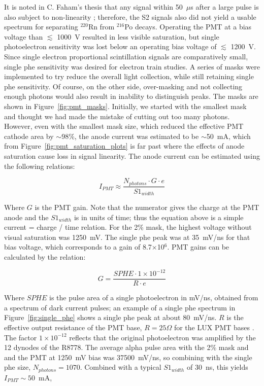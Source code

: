It is noted in C. Faham's thesis that any signal within 50~$\mu$s after a large pulse is also subject to non-linearity \cite{Faham2014a}; therefore, the S2 signals also did not yield a usable spectrum for separating  $^{220}$Rn from $^{216}$Po decays. Operating the \ac{PMT} at a bias voltage than $\lesssim$ 1000~V resulted in less visible saturation, but single photoelectron sensitivity was lost below an operating bias voltage of $\lesssim$ 1200~V. Since single electron proportional scintillation signals are comparatively small, single phe sensitivity was desired for electron train studies. A series of masks were implemented to try reduce the overall light collection, while still retaining single phe sensitivity. Of course, on the other side, over-masking and not collecting enough photons would also result in inability to distinguish peaks. The masks are shown in Figure~\ref{fig:pmt_masks}. Initially, we started with the smallest mask and thought we had made the mistake of cutting out too many photons. However, even with the smallest mask size, which reduced the effective \ac{PMT} cathode area by $\sim$98\%, the anode current was estimated to be $\sim$50~mA, which from Figure~\ref{fig:pmt_saturation_plots} is far past where the effects of anode saturation cause loss in signal linearity. The anode current can be estimated using the following relations:

\begin{equation}
I_{PMT} \approx \frac{N_{photons} \cdot G \cdot e}{S1_{width}}
\end{equation}

Where $G$ is the \ac{PMT} gain. Note that the numerator gives the charge at the \ac{PMT} anode and the $S1_{width}$ is in units of time; thus the equation above is a simple current = charge / time relation. For the 2\% mask, the highest voltage without visual saturation was 1250~mV. The single phe peak was at 35~mV/ns for that bias voltage, which corresponds to a gain of 8.7$\times$10$^{6}$. \ac{PMT} gains can be calculated by the relation:

\begin{equation}
G  = \frac{SPHE \cdot 1\times 10^{-12}} { R \cdot  e}
\end{equation}

Where $SPHE$ is the pulse area of a single photoelectron in mV/ns, obtained from a spectrum of dark current pulses; an example of a single phe spectrum in Figure~\ref{fig:single_phe} shows a single phe peak at about 80~mV/ns.  $R$ is the effective output resistance of the \ac{PMT} base,  $R=25\Omega$ for the \ac{LUX} \ac{PMT} bases \cite{Faham2014a}. The factor $1\times 10^{-12}$ reflects that the original photoelectron was amplified by the 12 dynodes of the R8778. The average alpha pulse area with the 2\% mask and and the \ac{PMT} at 1250~mV bias was 37500~mV/ns, so combining with the single phe size, $N_{photons} = 1070$. Combined with a typical $S1_{width}$ of 30~ns, this yields $I_{PMT} \sim50$~mA,

